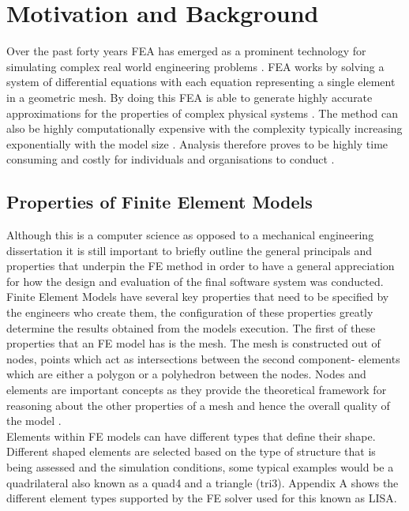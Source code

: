 
\section{Motivation and Background}
Over the past forty years FEA has emerged as a prominent technology for simulating complex real world engineering problems \cite{cite0, DolsakPaper94}. FEA works by solving a system of differential equations with each equation representing a single element in a geometric mesh. By doing this FEA is able to generate highly accurate approximations for the properties of complex physical systems \cite{DolsakPaper94} \cite{IntroductionToFE}. The method can also be highly computationally expensive with the complexity typically increasing exponentially with the model size \cite{DolsakPaper94}. Analysis therefore proves to be highly time consuming and costly for individuals and organisations to conduct \cite{ConsultRuleIntellSystemFE} \cite{cite03}.\\


\subsection{Properties of Finite Element Models}
Although this is a computer science as opposed to a mechanical engineering dissertation it is still important to briefly outline the general principals and properties that underpin the FE method in order to have a general appreciation for how the design and evaluation of the final software system was conducted. \\ 

\noindent
Finite Element Models have several key properties that need to be specified by the engineers who create them, the configuration of these properties greatly determine the results obtained from the models execution. The first of these properties that an FE model has is the mesh. The mesh is constructed out of nodes, points which act as intersections between the second component- elements which are either a polygon or a polyhedron between the nodes. Nodes and elements are important concepts as they provide the theoretical framework for reasoning about the other properties of a mesh and hence the overall quality of the model \cite{IntroductionToFE}.\\ 

\noindent
Elements within FE models can have different types that define their shape. Different shaped elements are selected based on the type of structure that is being assessed and the simulation conditions, some typical examples would be a quadrilateral also known as a quad4 and a triangle (tri3). Appendix A shows the different element types supported by the FE solver used for this known as LISA. \\ 

